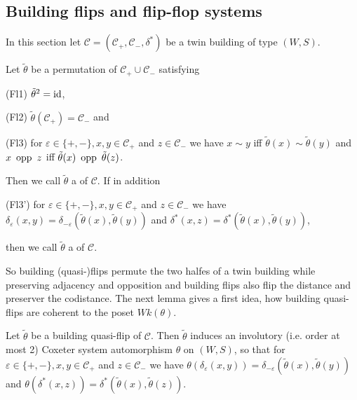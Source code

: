 \subsection{Building flips and flip-flop systems}
In this section let $\mathcal C = (\mathcal C_+, \mathcal C_-, \delta^*)$ be a twin building of type $(W,S)$.

\begin{defi}
	Let $\tilde \theta$ be a permutation of $\mathcal C_+ \cup \mathcal C_-$ satisfying
	\begin{axioms}
		\item[(Fl1)] \label{axiom:fl1} $\tilde \theta^2 = \operatorname{id}$,
		\item[(Fl2)] \label{axiom:fl2} $\tilde \theta(\mathcal C_+) = \mathcal C_-$ and
		\item[(Fl3)] \label{axiom:fl3} for $\varepsilon \in \{+,-\}, x,y \in \mathcal C_+$ and $z \in \mathcal C_-$ we have $x \sim y$ iff $\tilde \theta(x) \sim \tilde \theta(y)$ and $x \opp z$ iff $\tilde \theta(x) \opp \tilde \theta(z)$.
	\end{axioms}
	Then we call $\tilde \theta$ a  of $\mathcal{C}$. If in addition
	\begin{axioms}
		\item[(Fl3')] \label{axiom:fl3'} for $\varepsilon \in \{+,-\}, x,y \in \mathcal C_+$ and $z \in \mathcal C_-$ we have $\delta_\varepsilon(x,y) = \delta_{-\varepsilon}(\tilde \theta(x),\tilde \theta(y))$ and $\delta^*(x,z) = \delta^*(\tilde \theta(x),\tilde \theta(y))$, 
	\end{axioms}
	then we call $\tilde \theta$ a  of $\mathcal C$.
\end{defi}

So building (quasi-)flips permute the two halfes of a twin building while preserving adjacency and opposition and building flips also flip the distance and preserver the codistance. The next lemma gives a first idea, how building quasi-flips are coherent to the poset $Wk(\theta)$.

\begin{lemm}
	Let $\tilde \theta$ be a building quasi-flip of $\mathcal C$. Then $\tilde \theta$ induces an involutory (i.e. order at most 2) Coxeter system automorphism $\theta$ on $(W,S)$, so that for $\varepsilon \in \{+,-\}, x,y \in \mathcal C_+$ and $z \in \mathcal C_-$ we have $\theta(\delta_\varepsilon(x,y)) = \delta_{-\varepsilon}(\tilde \theta(x), \tilde \theta(y))$ and $\theta(\delta^*(x,z)) = \delta^*(\tilde \theta(x), \tilde \theta(z))$.
\end{lemm}

